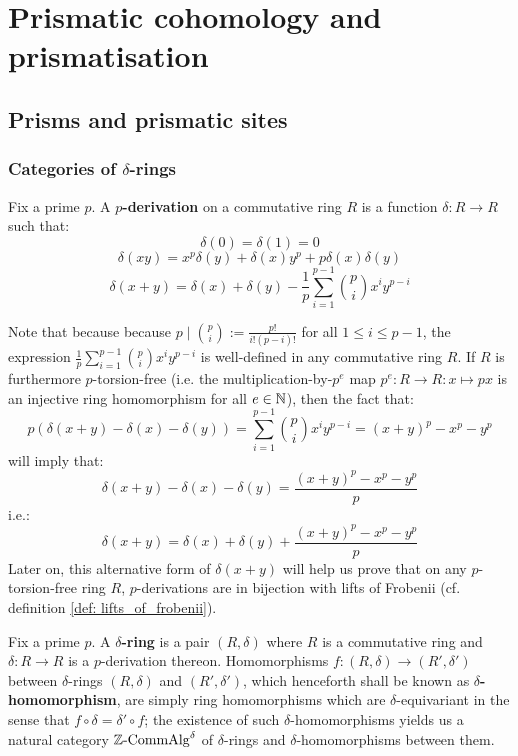 \section{Prismatic cohomology and prismatisation}
    \subsection{Prisms and prismatic sites}
        \subsubsection{Categories of \texorpdfstring{$\delta$}{}-rings}
            \begin{definition}[$p$-derivations] \label{def: p_derivations}
                Fix a prime $p$. A \textbf{$p$-derivation} on a commutative ring $R$ is a function $\delta: R \to R$ such that:
                    $$\delta(0) = \delta(1) = 0$$
                    $$\delta(xy) = x^p \delta(y) + \delta(x) y^p + p \delta(x) \delta(y)$$
                    $$\delta(x + y) = \delta(x) + \delta(y) - \frac1p \sum_{i = 1}^{p - 1} \binom{p}{i} x^i y^{p - i}$$
            \end{definition}
            \begin{remark}
                Note that because because $p \mid \binom{p}{i} := \frac{p!}{i! (p - i)!}$ for all $1 \leq i \leq p - 1$, the expression $\frac1p \sum_{i = 1}^{p - 1} \binom{p}{i} x^i y^{p - i}$ is well-defined in any commutative ring $R$. If $R$ is furthermore $p$-torsion-free (i.e. the multiplication-by-$p^e$ map $p^e: R \to R: x \mapsto px$ is an injective ring homomorphism for all $e \in \mathbb{N}$), then the fact that:
                    $$p(\delta(x + y) - \delta(x) - \delta(y)) = \sum_{i = 1}^{p - 1} \binom{p}{i} x^i y^{p - i} = (x + y)^p - x^p - y^p$$
                will imply that:
                    $$\delta(x + y) - \delta(x) - \delta(y) = \frac{(x + y)^p - x^p - y^p}{p}$$
                i.e.:
                    $$\delta(x + y) = \delta(x) + \delta(y) + \frac{(x + y)^p - x^p - y^p}{p}$$
                Later on, this alternative form of $\delta(x + y)$ will help us prove that on any $p$-torsion-free ring $R$, $p$-derivations are in bijection with lifts of Frobenii (cf. definition \ref{def: lifts_of_frobenii}).
            \end{remark}
            \begin{definition} \label{def: delta_rings}
                Fix a prime $p$. A \textbf{$\delta$-ring} is a pair $(R, \delta)$ where $R$ is a commutative ring and $\delta: R \to R$ is a $p$-derivation thereon. Homomorphisms $f: (R, \delta) \to (R', \delta')$ between $\delta$-rings $(R, \delta)$ and $(R', \delta')$, which henceforth shall be known as \textbf{$\delta$-homomorphism}, are simply ring homomorphisms which are $\delta$-equivariant in the sense that $f \circ \delta = \delta' \circ f$; the existence of such $\delta$-homomorphisms yields us a natural category $\mathbb{Z}\text{-}\mathrm{Comm}\mathrm{Alg}^{\delta}$ of $\delta$-rings and $\delta$-homomorphisms between them.
            \end{definition}
            
